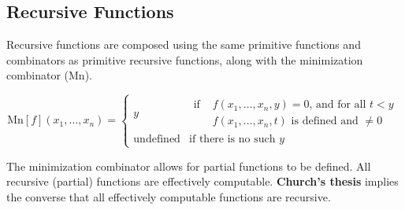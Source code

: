 \subsection{Recursive Functions}

Recursive functions are composed using the same primitive functions and 
combinators as primitive recursive functions, along with the minimization 
combinator ($\mathrm{Mn}$).

$$
\mathrm{Mn}[f](x_1, \ldots, x_n)=
  \begin{cases}
    y & 
    \begin{aligned}
      \textrm{if } &f(x_1, \ldots, x_n, y) = 0 \textrm{, and for all } t < y \\
      &f(x_1, \ldots, x_n, t) \textrm{ is defined and }\neq 0 
    \end{aligned}\\
    \mathrm{undefined} & \textrm{if there is no such } y
  \end{cases}
$$

The minimization combinator allows for partial functions to be defined. All
recursive (partial) functions are effectively computable. \textbf{Church's 
thesis} implies the converse that all effectively computable functions are 
recursive.

